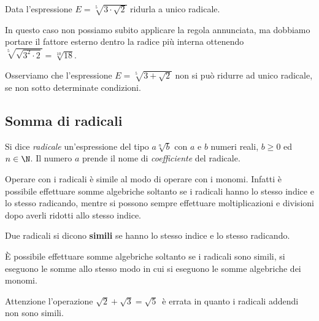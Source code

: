 \begin{esempio}{}{}
Data l'espressione \(E=\sqrt[5]{3\cdot\sqrt{2}}\) ridurla a unico radicale.

In questo caso non possiamo subito applicare la regola annunciata, ma 
dobbiamo  portare il fattore esterno dentro la radice più interna ottenendo 
\(\sqrt[5]{\sqrt{3^2 \cdot 2}}=\sqrt[10]{18}\).

Osserviamo che l'espressione \(E=\sqrt[5]{3+\sqrt{2}}\) non si può ridurre 
ad unico radicale, se non sotto determinate condizioni.
\end{esempio}
% 

\subsection{Somma di radicali}

Si dice \emph{radicale} un'espressione del tipo \(a\sqrt[n]b\) con \(a\) e 
\(b\) numeri reali, \(b \geqslant 0\) ed \(n\in \N\). 
Il numero \(a\) prende il nome di \emph{coefficiente} del radicale.

Operare con i radicali è simile al modo di operare con i monomi. Infatti è 
possibile effettuare somme algebriche soltanto se i radicali hanno lo 
stesso 
indice e lo stesso radicando, mentre si possono sempre effettuare 
moltiplicazioni e divisioni dopo averli ridotti allo stesso indice.
\begin{definizione}{}{}
Due radicali si dicono \textbf{simili} se hanno lo stesso indice e lo stesso
radicando.
\end{definizione}

È possibile effettuare somme algebriche soltanto se i radicali sono simili, 
si eseguono le somme allo stesso modo in cui si eseguono le somme 
algebriche 
dei monomi.

Attenzione l'operazione \(\sqrt{2}+\sqrt{3}=\sqrt 5\)\, è errata in quanto i 
radicali addendi non sono simili.



